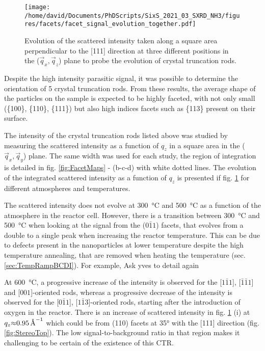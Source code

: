 \begin{figure}[!htb]
    \centering
    \texttt{[image: /home/david/Documents/PhDScripts/SixS\_2021\_03\_SXRD\_NH3/figures/facets/facet\_signal\_evolution\_together.pdf]}
    \caption{
    Evolution of the scattered intensity taken along a square area perpendicular to the [111] direction at three different positions in the ($\vec{q}_x, \vec{q}_z$) plane to probe the evolution of crystal truncation rods.
    }
    \label{fig:FacetSignal}
\end{figure}

Despite the high intensity parasitic signal, it was possible to determine the orientation of 5 crystal truncation rods.
From these results, the average shape of the particles on the sample is expected to be highly faceted, with not only small (\{100\}, \{110\}, \{111\}) but also high indices facets such as \{113\} present on their surface.

The intensity of the crystal truncation rods listed above was studied by measuring the scattered intensity as a function of $q_z$ in a square area in the ($\vec{q}_x, \vec{q}_y$) plane.
The same width was used for each study, the region of integration is detailed in fig. \ref{fig:FacetMaps} - (b-c-d) with white dotted lines.
The evolution of the integrated scattered intensity as a function of $q_z$ is presented if fig. \ref{fig:FacetSignal} for different atmospheres and temperatures.

The scattered intensity does not evolve at \qty{300}{\degreeCelsius} and \qty{500}{\degreeCelsius} as a function of the atmosphere in the reactor cell.
However, there is a transition between \qty{300}{\degreeCelsius} and \qty{500}{\degreeCelsius} when looking at the signal from the ($0\bar{1}1$) facets, that evolves from a double to a single peak when increasing the reactor temperature.
This can be due to defects present in the nanoparticles at lower temperature despite the high temperature annealing, that are removed when heating the temperature (sec. \ref{sec:TempRampBCDI}).
For example, \textcolor{Important}{Ask yves to detail again}

At \qty{600}{\degreeCelsius}, a progressive increase of the intensity is observed for the [$1\bar{1}1$], [$\bar{1}\bar{1}1$] and [$001$]-oriented rods, whereas a progressive decrease of the intensity is observed for the [$0\bar{1}1$], [$1\bar{1}3$]-oriented rods, starting after the introduction of oxygen in the reactor.
There is an increase of scattered intensity in fig. \ref{fig:FacetSignal} (i) at $q_z \qty{\approx 0.95}{\per\angstrom}$ which could be from (110) facets at \ang{35} with the [111] direction (fig. \ref{fig:StereoTop}).
The low signal-to-background ratio in that region makes it challenging to be certain of the existence of this CTR.

